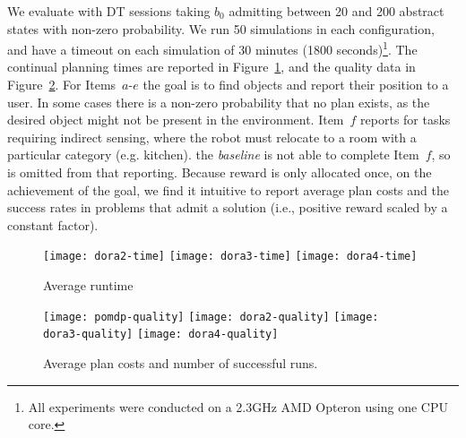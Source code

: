 We evaluate with DT sessions taking $b_0$ admitting between 20 and 200
abstract states with non-zero probability. We run 50 simulations in
each configuration, and have a timeout on each simulation of 30
minutes (1800 seconds)\footnote{All experiments were conducted on a
  2.3GHz AMD Opteron using one CPU core.}. The continual planning
times are reported in Figure~\ref{fig:results-time}, and the quality
data in Figure~\ref{fig:results-quality}.
For Items~$a$-$e$ the goal is to find objects and report their
position to a user. In some cases there is a non-zero probability that
no plan exists, as the desired object might not be present in the
environment. Item~$f$ reports for tasks requiring indirect sensing,
where the robot must relocate to a room with a particular category
(e.g. kitchen). the {\em baseline} is not able to complete Item~$f$,
so is omitted from that reporting.  Because reward is only allocated
once, on the achievement of the goal,  we find it
intuitive to report average plan costs and the success rates in
problems that admit a solution (i.e., positive reward scaled by a
constant factor).

\begin{figure}[h!]
  \texttt{[image: dora2-time]}\hfill
  \texttt{[image: dora3-time]}\hfill
  \texttt{[image: dora4-time]}\hfill
  \vspace{2mm}
  \caption{Average runtime}
  \label{fig:results-time}
\end{figure}

\begin{figure}[h!]
  \texttt{[image: pomdp-quality]}\hfill
  \texttt{[image: dora2-quality]}\hfill
  \texttt{[image: dora3-quality]}\hfill
  \texttt{[image: dora4-quality]}\hfill
  \vspace{2mm}
  \caption{Average plan costs and number of successful runs.}
  \label{fig:results-quality}
\end{figure}

